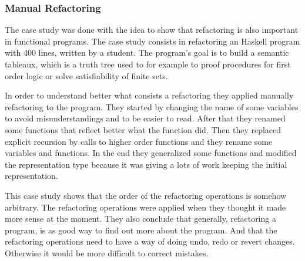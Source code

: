 


\subsubsection{Manual Refactoring}
\label{ssub:Manual-Refactoring}
The case study \cite{thompson2003case} was done with the idea to show that refactoring is also important in functional programs.
The case study consists in refactoring an Haskell program with 400 lines, written by a student.
The program's goal is to build a semantic tableaux, which is a truth tree used to  for example to proof procedures for first order logic or solve satisfiability of finite sets.

In order to understand better what consists a refactoring they applied manually refactoring to the program.
They started by changing the name of some variables to avoid misunderstandings and to be easier to read.
After that they renamed some functions that reflect better what the function did. 
Then they replaced explicit recursion by calls to higher order functions and they rename some variables and functions.
In the end they generalized some functions and modified the representation type because it was giving a lots of work keeping the initial representation.

This case study shows that the order of the refactoring operations is somehow arbitrary.
The refactoring operations were applied when they thought it made more sense at the moment.
They also conclude that generally, refactoring a program, is as good way to find out more about the program. 
And that the refactoring operations need to have a way of doing undo, redo or revert changes. 
Otherwise it would be more difficult to correct mistakes.

